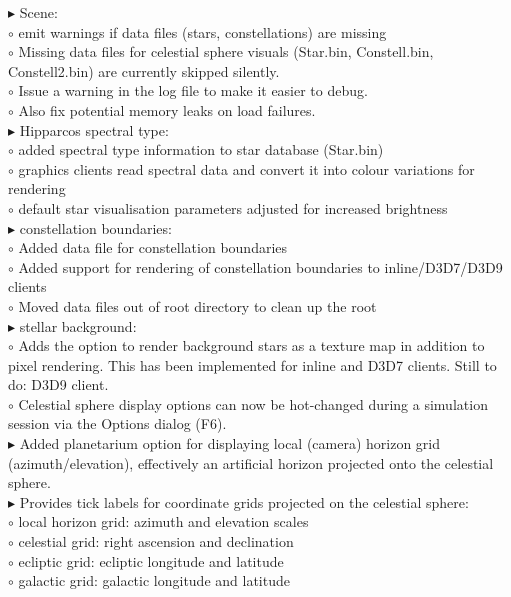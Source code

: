 \documentclass[Orbiter User Manual.tex]{subfiles}
\begin{document}
\begin{sloppypar}
$\blacktriangleright$ Scene:\\
$\circ$ emit warnings if data files (stars, constellations) are missing\\
$\circ$ Missing data files for celestial sphere visuals (Star.bin, Constell.bin, Constell2.bin) are currently skipped silently.\\
$\circ$ Issue a warning in the log file to make it easier to debug.\\
$\circ$ Also fix potential memory leaks on load failures.\\
$\blacktriangleright$ Hipparcos spectral type:\\
$\circ$ added spectral type information to star database (Star.bin)\\
$\circ$ graphics clients read spectral data and convert it into colour variations for rendering\\
$\circ$ default star visualisation parameters adjusted for increased brightness\\
$\blacktriangleright$ constellation boundaries:\\
$\circ$ Added data file for constellation boundaries\\
$\circ$ Added support for rendering of constellation boundaries to inline/D3D7/D3D9 clients\\
$\circ$ Moved data files out of root directory to clean up the root\\
$\blacktriangleright$ stellar background:\\
$\circ$ Adds the option to render background stars as a texture map in addition to pixel rendering. This has been implemented for inline and D3D7 clients. Still to do: D3D9 client.\\
$\circ$ Celestial sphere display options can now be hot-changed during a simulation session via the Options dialog (F6).\\
$\blacktriangleright$ Added planetarium option for displaying local (camera) horizon grid (azimuth/elevation), effectively an artificial horizon projected onto the celestial sphere.\\
$\blacktriangleright$ Provides tick labels for coordinate grids projected on the celestial sphere:\\
$\circ$ local horizon grid: azimuth and elevation scales\\
$\circ$ celestial grid: right ascension and declination\\
$\circ$ ecliptic grid: ecliptic longitude and latitude\\
$\circ$ galactic grid: galactic longitude and latitude\\

\end{sloppypar}
\end{document}
